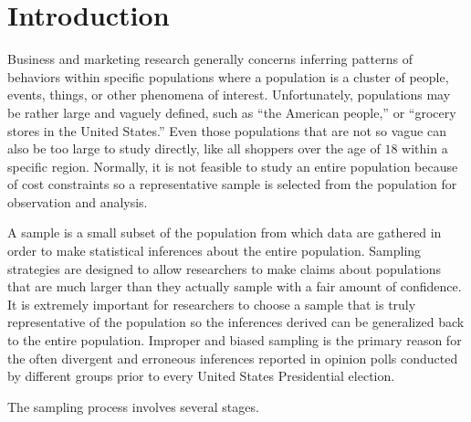 \section{Introduction}

Business and marketing research generally concerns inferring patterns of behaviors within specific populations where a \gls{population} is a cluster of people, events, things, or other phenomena of interest. Unfortunately, populations may be rather large and vaguely defined, such as ``the American people,'' or ``grocery stores in the United States.'' Even those populations that are not so vague can also be too large to study directly, like all shoppers over the age of $ 18 $ within a specific region. Normally, it is not feasible to study an entire population because of cost constraints so a representative sample is selected from the population for observation and analysis. 

A \gls{sample} is a small subset of the population from which data are gathered in order to make statistical inferences about the entire population. Sampling strategies are designed to allow researchers to make claims about populations that are much larger than they actually sample with a fair amount of confidence. It is extremely important for researchers to choose a sample that is truly representative of the population so the inferences derived can be generalized back to the entire population. Improper and biased sampling is the primary reason for the often divergent and erroneous inferences reported in opinion polls conducted by different groups prior to every United States Presidential election.

The sampling process involves several stages. 

